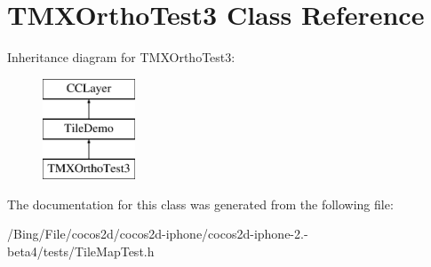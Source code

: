 \hypertarget{interface_t_m_x_ortho_test3}{\section{T\-M\-X\-Ortho\-Test3 Class Reference}
\label{interface_t_m_x_ortho_test3}
}
Inheritance diagram for T\-M\-X\-Ortho\-Test3\-:\begin{figure}[H]
\begin{center}
\leavevmode
\includegraphics[height=3.000000cm]{interface_t_m_x_ortho_test3}
\end{center}
\end{figure}


The documentation for this class was generated from the following file\-:\begin{DoxyCompactItemize}
\item 
/\-Bing/\-File/cocos2d/cocos2d-\/iphone/cocos2d-\/iphone-\/2.-\/beta4/tests/Tile\-Map\-Test.\-h\end{DoxyCompactItemize}
